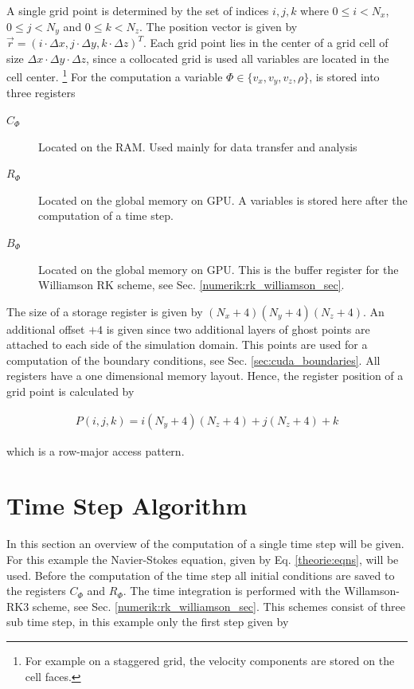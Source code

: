 A single grid point is determined by the set of indices $i,j,k$ where ${0\leq i < N_x}$,
${0\leq j < N_y}$ and ${0\leq k < N_z}$. The position vector is given by ${\vec{r} = (i\cdot\Delta x, j\cdot \Delta y, k\cdot \Delta z)^T}$.
Each grid point lies in the center of a grid cell of size $\Delta x \cdot \Delta y \cdot \Delta z$,
since a collocated grid is used all variables are located in the cell center.
\footnote{For example on a staggered grid, the velocity components are stored on the cell faces.}
For the computation a variable $\Phi\in\{v_x, v_y, v_z, \rho\}$, is stored into three registers

\begin{description}
    \item[$C_\Phi$] Located on the RAM. Used mainly for data transfer and analysis
    \item[$R_\Phi$] Located on the global memory on GPU. A variables is stored here after the computation of a time step.
    \item[$B_\Phi$] Located on the global memory on GPU. This is the buffer register for the Williamson RK scheme, see Sec. \ref{numerik:rk_williamson_sec}.
\end{description}

The size of a storage register is given by $(N_x+4)(N_y+4)(N_z+4)$.
An additional offset $+4$ is given since two additional layers of ghost points are attached to each side of the simulation domain.
This points are used for a computation of the boundary conditions, see Sec. \ref{sec:cuda_boundaries}.
All registers have a one dimensional memory layout.
Hence, the register position of a grid point is calculated by

\begin{align}
    P(i, j, k) = i(N_y+4)(N_z+4)+j(N_z+4)+k
\end{align}

which is a row-major access pattern.

\section{Time Step Algorithm}
\label{sec:cuda_timestep}

In this section an overview of the computation of a single time step will be given.
For this example the Navier-Stokes equation, given by Eq. \ref{theorie:eqns}, will be used.
Before the computation of the time step all initial conditions are saved to the
registers $C_{\Phi}$ and  $R_{\Phi}$.
The time integration is performed with the Willamson-RK3 scheme, see Sec. \ref{numerik:rk_williamson_sec}.
This schemes consist of three sub time step, in this example only the first step given by

